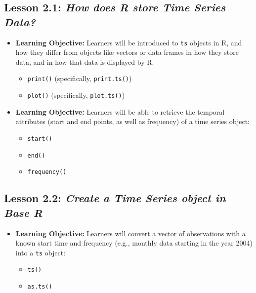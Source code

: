 \documentclass[
]{book}
\providecommand{\tightlist}{%
  \setlength{\itemsep}{0pt}\setlength{\parskip}{0pt}}
\begin{document}
\hypertarget{lesson-2.1-how-does-r-store-time-series-data}{%
\subsection*{\texorpdfstring{Lesson 2.1: \emph{How does R store Time Series Data?}}{Lesson 2.1: How does R store Time Series Data?}}\label{lesson-2.1-how-does-r-store-time-series-data}}

\begin{itemize}
\tightlist
\item
  \textbf{Learning Objective:} Learners will be introduced to \texttt{ts} objects in R, and how they differ from objects like vectors or data frames in how they store data, and in how that data is displayed by R:

  \begin{itemize}
  \tightlist
  \item
    \texttt{print()} (specifically, \texttt{print.ts()})
  \item
    \texttt{plot()} (specifically, \texttt{plot.ts()})
  \end{itemize}
\item
  \textbf{Learning Objective:} Learners will be able to retrieve the temporal attributes (start and end points, as well as frequency) of a time series object:

  \begin{itemize}
  \tightlist
  \item
    \texttt{start()}
  \item
    \texttt{end()}
  \item
    \texttt{frequency()}
  \end{itemize}
\end{itemize}

\hypertarget{lesson-2.2-create-a-time-series-object-in-base-r}{%
\subsection*{\texorpdfstring{Lesson 2.2: \emph{Create a Time Series object in Base R}}{Lesson 2.2: Create a Time Series object in Base R}}\label{lesson-2.2-create-a-time-series-object-in-base-r}}

\begin{itemize}
\tightlist
\item
  \textbf{Learning Objective:} Learners will convert a vector of observations with a known start time and frequency (e.g., monthly data starting in the year 2004) into a \texttt{ts} object:

  \begin{itemize}
  \tightlist
  \item
    \texttt{ts()}
  \item
    \texttt{as.ts()}
  \end{itemize}
\end{itemize}
\end{document}
